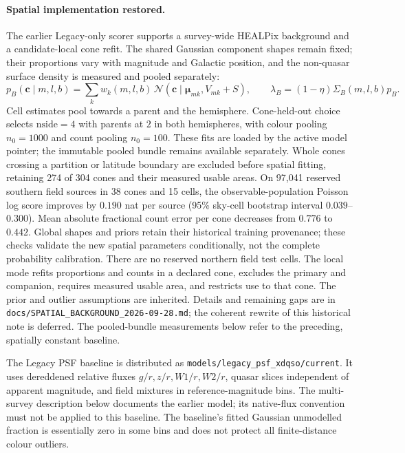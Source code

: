 \documentclass[11pt,a4paper]{article}
\begin{document}
\paragraph{Spatial implementation restored.}
The earlier Legacy-only scorer supports a survey-wide HEALPix background and a
candidate-local cone refit. The shared Gaussian component shapes remain fixed;
their proportions vary with magnitude and Galactic position, and the
non-quasar surface density is measured and pooled separately:
\[
 p_B(\mathbf c\mid m,l,b)=\sum_k w_k(m,l,b)\,
 \mathcal N(\mathbf c\mid\boldsymbol\mu_{mk},V_{mk}+S),
 \qquad \lambda_B=(1-\eta)\Sigma_B(m,l,b)p_B.
\]
Cell estimates pool towards a parent and the hemisphere. Cone-held-out choice
selects $\mathrm{nside}=4$ with parents at $2$ in both hemispheres, with colour
pooling $n_0=1000$ and count pooling $n_0=100$. These fits are loaded by the
active model pointer; the immutable pooled bundle remains available separately.
Whole cones crossing a partition or latitude boundary are excluded before
spatial fitting, retaining 274 of 304 cones and their measured usable areas.
On 97,041 reserved southern field sources in 38 cones and 15 cells, the
observable-population Poisson log score improves by $0.190$ nat per source
(95\% sky-cell bootstrap interval $0.039$--$0.300$). Mean absolute fractional
count error per cone decreases from $0.776$ to $0.442$. Global shapes and priors
retain their historical training provenance; these checks validate the new
spatial parameters conditionally, not the complete probability calibration.
There are no reserved northern field test cells. The local
mode refits proportions and counts in a declared cone, excludes the primary
and companion, requires measured usable area, and restricts use to that cone.
The prior and outlier assumptions are inherited. Details and remaining gaps
are in \texttt{docs/SPATIAL\_BACKGROUND\_2026-09-28.md}; the coherent rewrite of
this historical note is deferred. The pooled-bundle measurements below refer
to the preceding, spatially constant baseline.

The Legacy PSF baseline is distributed as
\texttt{models/legacy\_psf\_xdqso/current}. It uses dereddened relative fluxes
$g/r,z/r,W1/r,W2/r$, quasar slices independent of apparent magnitude, and
field mixtures in reference-magnitude bins. The multi-survey description below
documents the earlier model; its native-flux convention must not be applied to
this baseline. The baseline's fitted Gaussian unmodelled fraction is essentially
zero in some bins and does not protect all finite-distance colour outliers.
\end{document}
